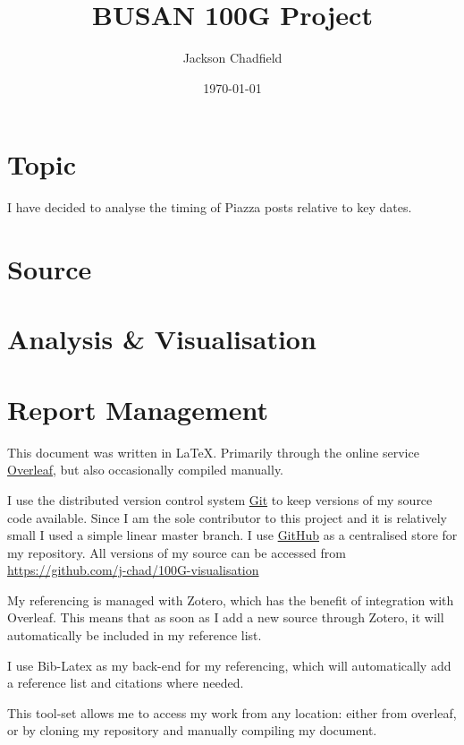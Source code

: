 \documentclass{article}
\title{BUSAN 100G Project}
\author{Jackson Chadfield}
\date{\today}
\begin{document}
\maketitle

\section{Topic}
I have decided to analyse the timing of Piazza posts relative to key dates.

\section{Source}

\section{Analysis \& Visualisation}

\section{Report Management}
This document was written in \LaTeX. Primarily through the online service \href{https://www.overleaf.com}{Overleaf}, but also occasionally compiled manually.

I use the distributed version control system \href{https://git-scm.com/}{Git} to keep versions of my source code available. Since I am the sole contributor to this project and it is relatively small I used a simple linear master branch. I use \href{https://github.com/}{GitHub} as a centralised store for my repository. All versions of my source can be accessed from \url{https://github.com/j-chad/100G-visualisation}

My referencing is managed with Zotero, which has the benefit of integration with Overleaf. This means that as soon as I add a new source through Zotero, it will automatically be included in my reference list. 

I use Bib-Latex as my back-end for my referencing, which will automatically add a reference list and citations where needed.

This tool-set allows me to access my work from any location: either from overleaf, or by cloning my repository and manually compiling my document.
\end{document}
